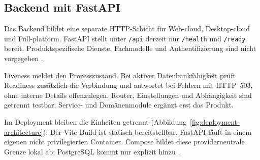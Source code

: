 \subsection{Backend mit FastAPI}
\label{subsec:fastapi-backend}

Das Backend bildet eine separate HTTP-Schicht für Web-cloud, Desktop-cloud und
Full-platform. FastAPI stellt unter \texttt{/api} derzeit nur
\texttt{/health} und \texttt{/ready} bereit. Produktspezifische Dienste,
Fachmodelle und Authentifizierung sind nicht vorgegeben
\parencite{fastapi2026features,kleiveist2026architecture}.

Liveness meldet den Prozesszustand. Bei aktiver Datenbankfähigkeit prüft
Readiness zusätzlich die Verbindung und antwortet bei Fehlern mit HTTP~503,
ohne interne Details offenzulegen. Router, Einstellungen und Abhängigkeit sind
getrennt testbar; Service- und Domänenmodule ergänzt erst das Produkt.

Im Deployment bleiben die Einheiten getrennt
(Abbildung~\ref{fig:deployment-architecture}): Der Vite-Build ist statisch
bereitstellbar, FastAPI läuft in einem eigenen nicht privilegierten Container.
Compose bildet diese providerneutrale Grenze lokal ab; PostgreSQL kommt nur
explizit hinzu
\parencite{kleiveist2026deployment}.


